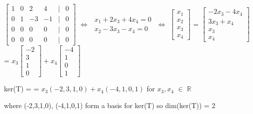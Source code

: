 \begin{tbox}
        \hspace{0.5cm}
        \footnotesize
        $\begin{bmatrix}
            1 & 0 & 2 & 4 & | & 0 \\
            0 & 1 & -3 & -1 & | & 0 \\
            0 & 0 & 0 & 0 & | & 0 \\
            0 & 0 & 0 & 0 & | & 0
        \end{bmatrix}$
        \hspace{0.2cm}
        $\Leftrightarrow$
        \hspace{0.2cm}
        $\begin{matrix*}
            x_1 + 2x_3 + 4x_4 = 0 \\
            x_2 - 3x_3 - x_4 = 0
        \end{matrix*}$
        \hspace{0.2cm}
        $\Leftrightarrow$
        \hspace{0.2cm}
        $\begin{bmatrix}
            x_1 \\
            x_2 \\
            x_3 \\
            x_4
        \end{bmatrix}$ =
        $\begin{bmatrix}
            -2x_3 - 4x_4 \\
            3x_3 + x_4 \\
            x_3 \\
            x_4 
        \end{bmatrix}$ =
        $x_3\begin{bmatrix}
                -2 \\
                3 \\
                1 \\
                0    
            \end{bmatrix} +
        x_4\begin{bmatrix}
                -4 \\
                1 \\
                0 \\
                1    
            \end{bmatrix}$
        
        \normalsize
        \hspace{0.5cm}
        ker(T) =
        = $x_3(-2,3,1,0) + x_4(-4,1,0,1)$
        \hspace{0.5cm}
        for $x_3,x_4$ $\in$ $\mathbb{R}$
        
        \hspace{0.5cm}
        where (-2,3,1,0), (-4,1,0,1) form a basis for ker(T) so dim(ker(T)) = 2
    \end{tbox}


